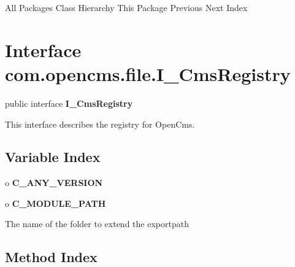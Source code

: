 \begin{PRE}
All Packages  Class Hierarchy  This Package  Previous  Next  Index
\end{PRE}

\htmlHR

\section{  Interface com.opencms.file.I\_CmsRegistry }

\begin{description}
\item public interface {\bf I\_CmsRegistry} 
\end{description}

This interface describes the registry for OpenCms. 

\htmlHR

\subsection*{  Variable Index }

\begin{description}
\item o {\bf C\_ANY\_VERSION}  

\item o {\bf C\_MODULE\_PATH}  

The name of the folder to extend the exportpath 
\end{description}

\subsection*{  Method Index }

